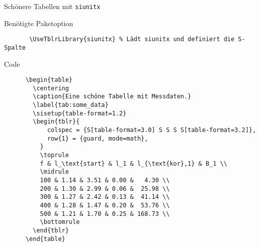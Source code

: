 \begin{frame}[fragile]{
  Schönere Tabellen mit \texttt{siunitx}
  \hfill
}
  \fontsize{8}{6}
  \begin{block}{Benötigte Paketoption}
    \begin{verbatim}
       \UseTblrLibrary{siunitx} % Lädt siunitx und definiert die S-Spalte
     \end{verbatim}
  \end{block}

  \begin{block}{Code}
    \begin{verbatim}
      \begin{table}
        \centering
        \caption{Eine schöne Tabelle mit Messdaten.}
        \label{tab:some_data}
        \sisetup{table-format=1.2}
        \begin{tblr}{
            colspec = {S[table-format=3.0] S S S S[table-format=3.2]},
            row{1} = {guard, mode=math},
          }
          \toprule
          f & l_\text{start} & l_1 & l_{\text{kor},1} & B_1 \\
          \midrule
          100 & 1.14 & 3.51 & 0.00 &   4.30 \\
          200 & 1.30 & 2.99 & 0.06 &  25.98 \\
          300 & 1.27 & 2.42 & 0.13 &  41.14 \\
          400 & 1.28 & 1.47 & 0.20 &  53.76 \\
          500 & 1.21 & 1.70 & 0.25 & 168.73 \\
          \bottomrule
        \end{tblr}
      \end{table}
    \end{verbatim}
  \end{block}
\end{frame}

